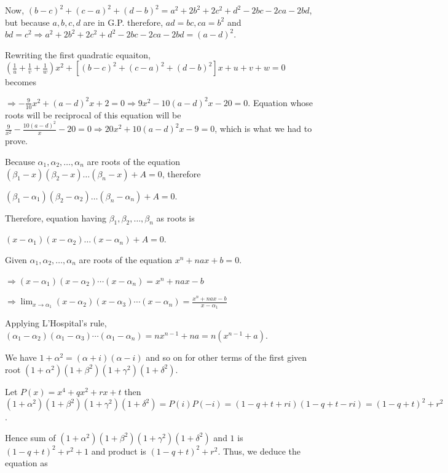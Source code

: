  Now, $(b - c)^2 + (c - a)^2 + (d - b)^2 = a^2 + 2b^2 + 2c^2 + d^2 - 2bc - 2ca - 2bd$, but because $a, b,
  c, d$ are in G.P. therefore, $ad = bc, ca = b^2$ and $bd = c^2\Rightarrow a^2 + 2b^2 + 2c^2 + d^2 - 2bc -
  2ca - 2bd = (a - d)^2$.

  Rewriting the first quadratic equaiton, $\left(\frac{1}{u} + \frac{1}{v} + \frac{1}{w}\right)x^2 +[(b - c)^2 + (c -
    a)^2 + (d - b)^2]x + u + v + w = 0$ becomes

  $\Rightarrow -\frac{9}{10}x^2 + (a - d)^2x + 2 = 0 \Rightarrow 9x^2 - 10(a - d)^2x - 20 = 0$. Equation
  whose roots will be reciprocal of this equation will be $\frac{9}{x^2} - \frac{10(a - d)^2}{x} - 20 =
  0\Rightarrow 20x^2 + 10(a - d)^2x - 9 = 0$, which is what we had to prove.
\item Because $\alpha_1, \alpha_2, \ldots, \alpha_n$ are roots of the equation $(\beta_1 - x)(\beta_2 -
  x)\ldots (\beta_n - x) + A = 0$, therefore

  $(\beta_1 - \alpha_1)(\beta_2 - \alpha_2)\ldots (\beta_n - \alpha_n) + A = 0$.

  Therefore, equation having $\beta_1, \beta_2, \ldots, \beta_n$ as roots is

  $(x - \alpha_1)(x - \alpha_2)\ldots(x - \alpha_n) + A = 0$.
\item Given $\alpha_1, \alpha_2, \ldots, \alpha_n$ are roots of the equation $x^n + nax + b = 0$.

  $\Rightarrow (x - \alpha_1)(x - \alpha_2)\cdots(x - \alpha_n) = x^n + nax - b$

  $\displaystyle\Rightarrow \lim_{x\to\alpha_1}(x - \alpha_2)(x - \alpha_3)\cdots(x - \alpha_n) = \frac{x^n
  + nax - b}{x - \alpha_1}$

  Applying L'Hospital's rule, $(\alpha_1 - \alpha_2)(\alpha_1 - \alpha_3)\cdots(\alpha_1 - \alpha_n) = nx^{n
    - 1} + na = n(x^{n - 1} + a)$.
\item We have $1 + \alpha^2 = (\alpha + i)(\alpha - i)$ and so on for other terms of the first given root
  $(1 + \alpha^2)(1 + \beta^2)(1 + \gamma^2)(1 + \delta^2)$.

  Let $P(x) = x^4 + qx^2 + rx + t$ then $(1 + \alpha^2)(1 + \beta^2)(1 + \gamma^2)(1 + \delta^2) = P(i)P(-i)
  = (1 - q + t + ri)(1 - q + t - ri) = (1 - q + t)^2 + r^2$.

  Hence sum of $(1 + \alpha^2)(1 + \beta^2)(1 + \gamma^2)(1 + \delta^2)$ and $1$ is $(1 - q + t)^2 + r^2 +
  1$ and product is $(1 - q + t)^2 + r^2$. Thus, we deduce the equation as


